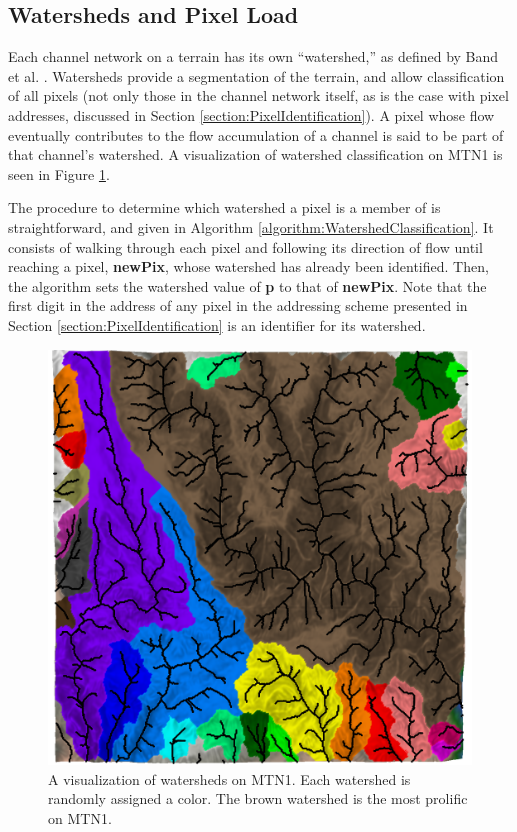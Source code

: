 \subsection{Watersheds and Pixel Load}
\label{section:PixelLoad}

Each channel network on a terrain has its own ``watershed,'' as defined by Band et al. \cite{band86}. 
Watersheds provide a segmentation of the terrain, and allow classification of all pixels (not only those in the channel network itself, as is the case with pixel addresses, discussed in Section \ref{section:PixelIdentification}). 
A pixel whose flow eventually contributes to the flow accumulation of a channel is said to be part of that channel's watershed. A visualization of watershed classification on MTN1 is seen in Figure \ref{figure:WatershedVisualization}. 

The procedure to determine which watershed a pixel is a member of is straightforward, and given in Algorithm \ref{algorithm:WatershedClassification}. 
It consists of walking through each pixel and following its direction of flow until reaching a pixel, \textbf{newPix}, whose watershed has already been identified. Then, the algorithm sets the watershed value of \textbf{p} to that of \textbf{newPix}.
Note that the first digit in the address of any pixel in the addressing scheme presented in Section \ref{section:PixelIdentification} is an identifier for its watershed.

\begin{figure}[t]
\begin{minipage}[b]{0.9\linewidth}
\centering
\includegraphics[width=\linewidth]{images/Watersheds_mtn1.png}
\end{minipage}
\caption[Visualization of watersheds on MTN1]{\label{figure:WatershedVisualization}A visualization of watersheds on MTN1. Each watershed is randomly assigned a color. The brown watershed is the most prolific on MTN1.}
\end{figure}

